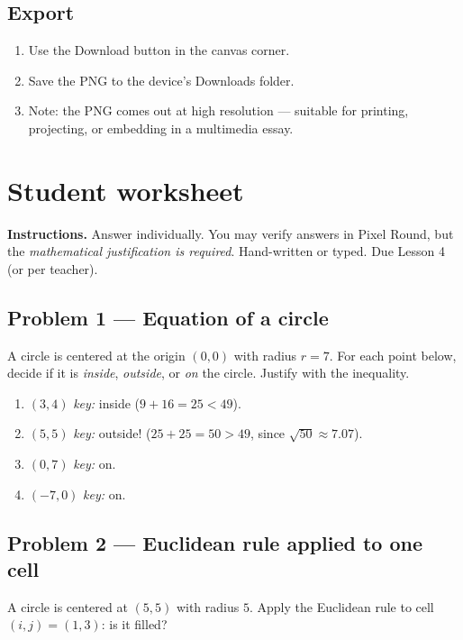 \documentclass[12pt,letterpaper]{scrartcl}
\begin{document}
\subsection{Export}
\begin{enumerate}[leftmargin=1.5em,itemsep=0.15em,topsep=0.3em]
  \item Use the Download button in the canvas corner.
  \item Save the PNG to the device's Downloads folder.
  \item Note: the PNG comes out at high resolution --- suitable for printing, projecting, or embedding in a multimedia essay.
\end{enumerate}

\newpage
\section{Student worksheet}\label{ap:hw}

\textbf{Instructions.} Answer individually. You may verify answers in Pixel Round, but the \emph{mathematical justification is required}. Hand-written or typed. Due Lesson 4 (or per teacher).

\subsection*{Problem 1 --- Equation of a circle}
A circle is centered at the origin $(0, 0)$ with radius $r = 7$. For each point below, decide if it is \emph{inside}, \emph{outside}, or \emph{on} the circle. Justify with the inequality.
\begin{enumerate}[label=\alph*),leftmargin=1.5em,itemsep=0.1em,topsep=0.2em,nosep]
  \item $(3, 4)$ \hfill \emph{key:} inside ($9 + 16 = 25 < 49$).
  \item $(5, 5)$ \hfill \emph{key:} outside! ($25 + 25 = 50 > 49$, since $\sqrt{50} \approx 7.07$).
  \item $(0, 7)$ \hfill \emph{key:} on.
  \item $(-7, 0)$ \hfill \emph{key:} on.
\end{enumerate}

\subsection*{Problem 2 --- Euclidean rule applied to one cell}
A circle is centered at $(5, 5)$ with radius $5$. Apply the Euclidean rule to cell $(i, j) = (1, 3)$: is it filled?
\end{document}
